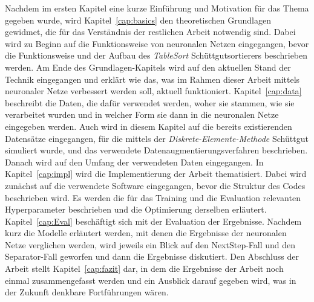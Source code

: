 Nachdem im ersten Kapitel eine kurze Einführung und Motivation für das Thema gegeben wurde, 
wird Kapitel~\ref{cap:basics} den theoretischen Grundlagen gewidmet, die für das Verständnis der restlichen Arbeit notwendig sind.
Dabei wird zu Beginn auf die Funktionsweise von neuronalen Netzen eingegangen, 
bevor die Funktionsweise und der Aufbau des \textit{TableSort} Schüttgutsortierers beschrieben werden.
Am Ende des Grundlagen-Kapitels wird auf den aktuellen Stand der Technik eingegangen und erklärt wie das, 
was im Rahmen dieser Arbeit mittels neuronaler Netze verbessert werden soll, aktuell funktioniert.
Kapitel~\ref{cap:data} beschreibt die Daten, die dafür verwendet werden,
woher sie stammen, wie sie verarbeitet wurden und in welcher Form sie dann in die neuronalen Netze eingegeben werden.
Auch wird in diesem Kapitel auf die bereits existierenden Datensätze eingegangen, für die mittels der \textit{Diskrete-Elemente-Methode} Schüttgut simuliert wurde,
und das verwendete Datenaugmentierungsverfahren beschrieben.
Danach wird auf den Umfang der verwendeten Daten eingegangen.
In Kapitel~\ref{cap:impl} wird die Implementierung der Arbeit thematisiert.
Dabei wird zunächst auf die verwendete Software eingegangen, bevor die Struktur des Codes beschrieben wird.
Es werden die für das Training und die Evaluation relevanten Hyperparameter beschrieben und die Optimierung derselben erläutert.
Kapitel~\ref{cap:Eval} beschäftigt sich mit der Evaluation der Ergebnisse.
Nachdem kurz die Modelle erläutert werden, mit denen die Ergebnisse der neuronalen Netze verglichen werden,
wird jeweils ein Blick auf den NextStep-Fall und den Separator-Fall geworfen und dann die Ergebnisse diskutiert.
Den Abschluss der Arbeit stellt Kapitel~\ref{cap:fazit} dar, in dem die Ergebnisse der Arbeit noch einmal zusammengefasst werden 
und ein Ausblick darauf gegeben wird, was in der Zukunft denkbare Fortführungen wären.

